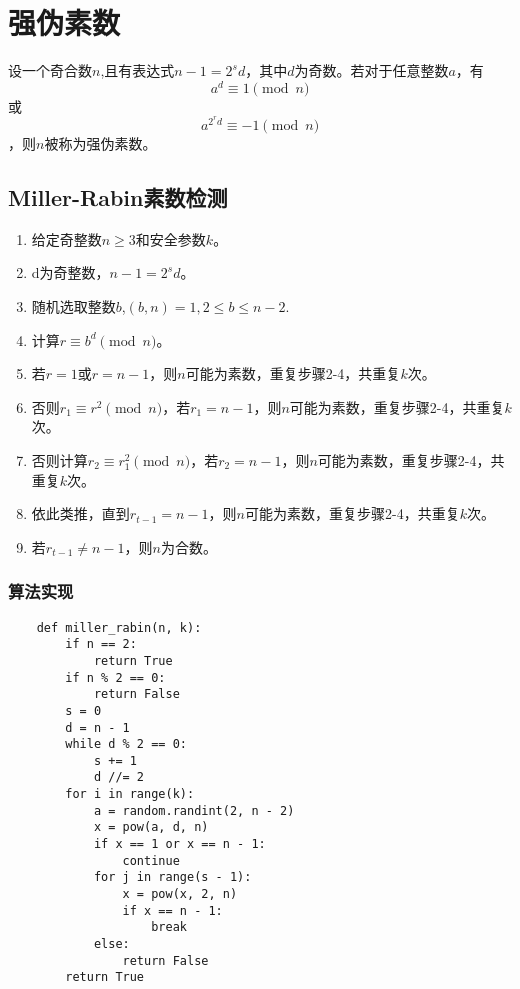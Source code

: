 \documentclass[a4paper]{article}
\begin{document}
\section{强伪素数}
设一个奇合数$n$,且有表达式$n-1=2^sd$，其中$d$为奇数。若对于任意整数$a$，有$$a^d\equiv1\pmod n$$或$$a^{2^rd}\equiv-1\pmod n$$，则$n$被称为强伪素数。
\subsection{Miller-Rabin素数检测}
\begin{enumerate}
    \item 给定奇整数$n\geq3$和安全参数$k$。
    \item d为奇整数，$n-1=2^sd$。
    \item 随机选取整数$b$,$(b,n)=1,2\leq b\leq n-2$.
    \item 计算$r\equiv b^d\pmod n$。
    \item 若$r=1$或$r=n-1$，则$n$可能为素数，重复步骤2-4，共重复$k$次。
    \item 否则$r_{1}\equiv r^2\pmod n$，若$r_{1}=n-1$，则$n$可能为素数，重复步骤2-4，共重复$k$次。
    \item 否则计算$r_{2}\equiv r_{1}^2\pmod n$，若$r_{2}=n-1$，则$n$可能为素数，重复步骤2-4，共重复$k$次。
    \item 依此类推，直到$r_{t-1}=n-1$，则$n$可能为素数，重复步骤2-4，共重复$k$次。
    \item 若$r_{t-1}\neq n-1$，则$n$为合数。
\end{enumerate}
\subsubsection{算法实现}
\begin{verbatim}
    def miller_rabin(n, k):
        if n == 2:
            return True
        if n % 2 == 0:
            return False
        s = 0
        d = n - 1
        while d % 2 == 0:
            s += 1
            d //= 2
        for i in range(k):
            a = random.randint(2, n - 2)
            x = pow(a, d, n)
            if x == 1 or x == n - 1:
                continue
            for j in range(s - 1):
                x = pow(x, 2, n)
                if x == n - 1:
                    break
            else:
                return False
        return True
\end{verbatim}
\end{document}
